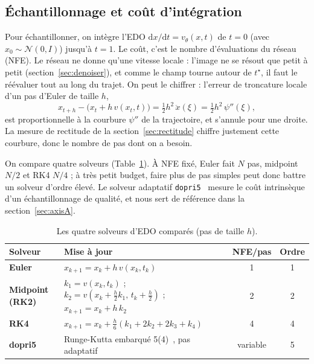 \documentclass[11pt]{article}
\newcommand{\code}[1]{\texttt{#1}}
\begin{document}
\subsection{Échantillonnage et coût d'intégration}
\label{sec:solvers}

Pour échantillonner, on intègre l'EDO $\mathrm{d}x/\mathrm{d}t = v_\theta(x, t)$ de $t{=}0$ (avec $x_0 \sim
\mathcal{N}(0,I)$) jusqu'à $t{=}1$. Le coût, c'est le nombre d'évaluations du réseau (NFE). Le réseau ne
donne qu'une vitesse locale : l'image ne se résout que petit à petit (section~\ref{sec:denoiser}), et comme
le champ tourne autour de $t^\star$, il faut le réévaluer tout au long du trajet. On peut le chiffrer :
l'erreur de troncature locale d'un pas d'Euler de taille $h$,
\begin{equation}
x_{t+h} - \big(x_t + h\,v(x_t,t)\big) = \tfrac{1}{2}h^2\,\ddot{x}(\xi) = \tfrac{1}{2}h^2\,\psi''(\xi),
\label{eq:euler}
\end{equation}
est proportionnelle à la courbure $\psi''$ de la trajectoire, et s'annule pour une droite. La mesure de
rectitude de la section~\ref{sec:rectitude} chiffre justement cette courbure, donc le nombre de pas dont on a
besoin.

On compare quatre solveurs (Table~\ref{tab:solvers}). À NFE fixé, Euler fait $N$ pas, midpoint $N/2$ et RK4
$N/4$ ; à très petit budget, faire plus de pas simples peut donc battre un solveur d'ordre élevé. Le solveur
adaptatif \code{dopri5}~\cite{chen2018neuralode,dormand1980rk} mesure le coût intrinsèque d'un échantillonnage
de qualité, et nous sert de référence dans la section~\ref{sec:axisA}.

\begin{table}[htbp]
\centering
\caption{Les quatre solveurs d'EDO comparés (pas de taille $h$).}
\label{tab:solvers}
\begin{tabularx}{\textwidth}{>{\bfseries}l X c c}
\toprule
Solveur & Mise à jour & NFE/pas & Ordre \\
\midrule
Euler & $x_{k+1} = x_k + h\,v(x_k, t_k)$ & 1 & 1 \\
Midpoint (RK2) & $k_1 = v(x_k, t_k)$ ; $k_2 = v(x_k + \tfrac{h}{2}k_1,\, t_k + \tfrac{h}{2})$ ; $x_{k+1} = x_k + h\,k_2$ & 2 & 2 \\
RK4 & $x_{k+1} = x_k + \tfrac{h}{6}(k_1 + 2k_2 + 2k_3 + k_4)$ & 4 & 4 \\
dopri5 & Runge-Kutta embarqué 5(4)~\cite{dormand1980rk}, pas adaptatif & variable & 5 \\
\bottomrule
\end{tabularx}
\end{table}
\end{document}
